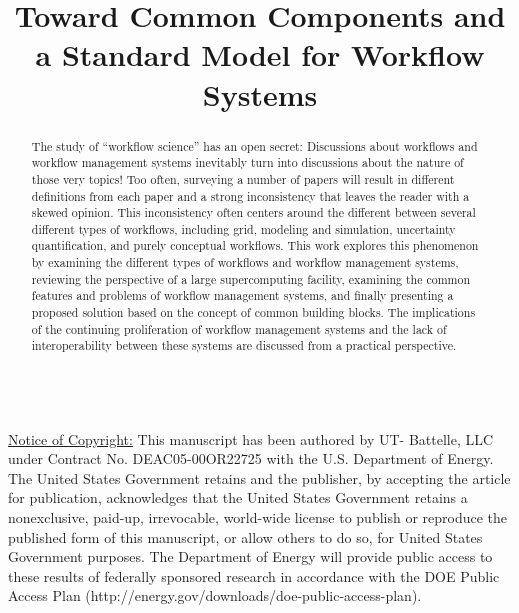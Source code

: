 \documentclass[10pt,conference,final]{IEEEtran}
\begin{document}
\title{Toward Common Components and a Standard Model for Workflow Systems}


\author{  \and {}  }

\maketitle

\begin{abstract}

The study of ``workflow science'' has an open secret: Discussions about workflows and workflow management systems inevitably turn into discussions about the nature of those very topics! Too often, surveying a number of papers will result in different definitions from each paper and a strong inconsistency that leaves the reader with a skewed opinion. This inconsistency often centers around the different between several different types of workflows, including grid, modeling and simulation, uncertainty quantification, and purely conceptual workflows. This work explores this phenomenon by examining the different types of workflows and workflow management systems, reviewing the perspective of a large supercomputing facility, examining the common features and problems of workflow management systems, and finally presenting a proposed solution based on the concept of common building blocks. The implications of the continuing proliferation of workflow management systems and the lack of interoperability between these systems are discussed from a practical perspective.

\end{abstract}
\hfill \\
\underline{Notice of Copyright:} This manuscript has been authored by UT-
Battelle, LLC under Contract No. DEAC05-00OR22725 with the U.S. Department of
Energy. The United States Government retains and the publisher, by accepting
the article for publication, acknowledges that the United States Government
retains a nonexclusive, paid-up, irrevocable, world-wide license to publish or
reproduce the published form of this manuscript, or allow others to do so, for
United States Government purposes. The Department of Energy will provide
public access to these results of federally sponsored research in accordance
with the DOE Public Access Plan (http://energy.gov/downloads/doe-public-access-plan).












\end{document}
